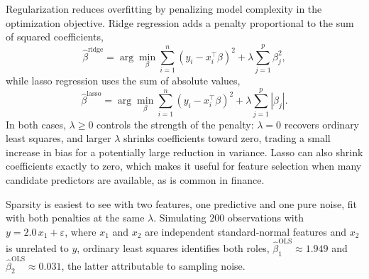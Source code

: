 \documentclass[../ai_in_finance]{subfiles}
\begin{document}
Regularization reduces overfitting by penalizing model complexity in the optimization objective. Ridge regression adds a penalty proportional to the sum of squared coefficients,
\begin{equation}
\label{eq:ml-ridge}
\hat\beta^{\text{ridge}} = \arg\min_\beta \sum_{i=1}^n (y_i - x_i^\top \beta)^2 + \lambda \sum_{j=1}^p \beta_j^2,
\end{equation}
while lasso regression uses the sum of absolute values,
\begin{equation}
\label{eq:ml-lasso}
\hat\beta^{\text{lasso}} = \arg\min_\beta \sum_{i=1}^n (y_i - x_i^\top \beta)^2 + \lambda \sum_{j=1}^p |\beta_j|.
\end{equation}
In both cases, $\lambda \geq 0$ controls the strength of the penalty: $\lambda = 0$ recovers ordinary least squares, and larger $\lambda$ shrinks coefficients toward zero, trading a small increase in bias for a potentially large reduction in variance. Lasso can also shrink coefficients exactly to zero, which makes it useful for feature selection when many candidate predictors are available, as is common in finance.


Sparsity is easiest to see with two features, one predictive and one pure noise, fit with both penalties at the same $\lambda$. Simulating $200$ observations with $y = 2.0\,x_1 + \varepsilon$, where $x_1$ and $x_2$ are independent standard-normal features and $x_2$ is unrelated to $y$, ordinary least squares identifies both roles, $\hat\beta_1^{\text{OLS}} \approx 1.949$ and $\hat\beta_2^{\text{OLS}} \approx 0.031$, the latter attributable to sampling noise.
\end{document}
